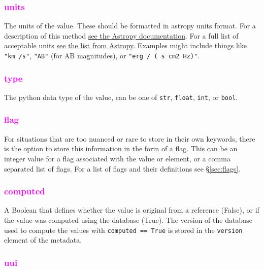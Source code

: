 \documentclass[tighten]{aastex631}
\newcommand{\keyword}[1]{\textcolor{magenta}{#1}}
\begin{document}
\subsubsection{\keyword{units}} \label{subsec:units}

The units of the value. These should be formatted in astropy units format. For a description of this method \href{https://docs.astropy.org/en/stable/units/format.html#converting-from-strings}{see the Astropy documentation}. For a full list of acceptable units \href{https://docs.astropy.org/en/stable/units/#module-astropy.units.si}{see the list from Astropy}. Examples might include things like {\tt "km /s"},  {\tt "AB"} (for AB magnitudes), or {\tt "erg / ( s  cm2  Hz)"}.

\subsubsection{\keyword{type}} \label{subsec:type}

The python data type of the value, can be one of {\tt str},  {\tt float},  {\tt int},  or {\tt bool}.

\subsubsection{\keyword{flag}} \label{subsec:flag}

For situations that are too nuanced or rare to store in their own keywords, there is the option to store this information in the form of a flag. This can be an integer value for a flag associated with the value or element, or a comma separated list of flags. For a list of flags and their definitions see \S\ref{sec:flags}.

\subsubsection{\keyword{computed}} \label{subsec:computed}

A Boolean that defines whether the value is original from a reference (False), or if the value was computed using the database (True). The version of the database used to compute the values with {\tt computed == True} is stored in the {\tt version} element of the metadata.

\subsubsection{\keyword{uui}} \label{subsec:uui}
\end{document}
